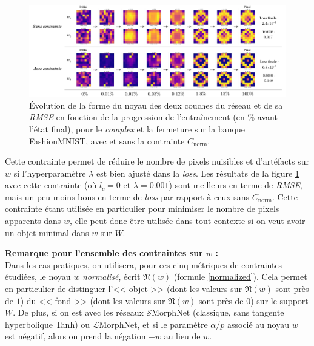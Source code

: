 
\vspace{-0.8mm}
\begin{figure}[htp]
  \begin{center}
    \includegraphics[width=1.00\linewidth]{parts/3-contributions/C-contraintes_geometriques/figures/k_norm.pdf}
    \vspace{-4.0mm}
    \caption{ \centering Évolution de la forme du noyau des deux couches du réseau et de sa \textit{RMSE} en fonction de la progression de l'entraînement (en \% avant l'état final), pour le \textit{complex} et la fermeture sur la banque FashionMNIST, avec et sans la contrainte $C_\text{norm}$.}
    \label{fig:c_norm}
  \end{center}
\end{figure}

\vspace{-3.0mm}
\noindent Cette contrainte permet de réduire le nombre de pixels nuisibles et d'artéfacts sur $w$ si l'hyperparamètre $\lambda$ est bien ajusté dans la \textit{loss}. Les résultats de la figure \ref{fig:c_norm} avec cette contrainte (où $l_c = 0$ et $\lambda = 0.001$) sont meilleurs en terme de \textit{RMSE}, mais un peu moins bons en terme de \textit{loss} par rapport à ceux sans $C_\text{norm}$.
Cette contrainte étant utilisée en particulier pour minimiser le nombre de pixels apparents dans $w$, elle peut donc être utilisée dans tout contexte si on veut avoir un objet minimal dans $w$ sur $W$.


\newpage

\noindent \textbf{Remarque pour l'ensemble des contraintes sur $w$ :} \\

\vspace{-1.0mm}
\noindent Dans les cas pratiques, on utilisera, pour ces cinq métriques de contraintes étudiées, le noyau $w$ \textit{normalisé}, écrit $\mathfrak{N}(w)$ (formule \ref{normalized}). Cela permet en particulier de distinguer l'<< objet >> (dont les valeurs sur $\mathfrak{N}(w)$ sont près de $1$) du << fond >> (dont les valeurs sur $\mathfrak{N}(w)$ sont près de $0$) sur le support $W$. De plus, si on est avec les réseaux $\mathcal{S}$MorphNet (classique, sans tangente hyperbolique Tanh) ou $\mathcal{L}$MorphNet, et si le paramètre $\alpha/p$ associé au noyau $w$ est négatif, alors on prend la négation $-w$ au lieu de $w$.
